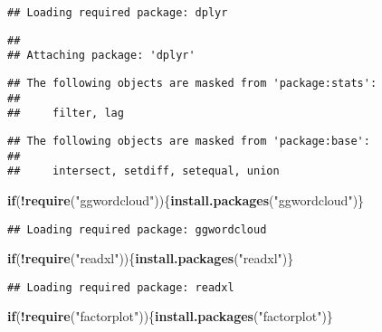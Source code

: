\documentclass[
]{article}
\newenvironment{Shaded}{\begin{snugshade}}{\end{snugshade}}
\newcommand{\ControlFlowTok}[1]{\textcolor[rgb]{0.13,0.29,0.53}{\textbf{#1}}}
\newcommand{\KeywordTok}[1]{\textcolor[rgb]{0.13,0.29,0.53}{\textbf{#1}}}
\newcommand{\NormalTok}[1]{#1}
\newcommand{\OperatorTok}[1]{\textcolor[rgb]{0.81,0.36,0.00}{\textbf{#1}}}
\newcommand{\StringTok}[1]{\textcolor[rgb]{0.31,0.60,0.02}{#1}}
\begin{document}
\begin{verbatim}
## Loading required package: dplyr
\end{verbatim}

\begin{verbatim}
## 
## Attaching package: 'dplyr'
\end{verbatim}

\begin{verbatim}
## The following objects are masked from 'package:stats':
## 
##     filter, lag
\end{verbatim}

\begin{verbatim}
## The following objects are masked from 'package:base':
## 
##     intersect, setdiff, setequal, union
\end{verbatim}

\begin{Shaded}
\begin{Highlighting}[]
\ControlFlowTok{if}\NormalTok{(}\OperatorTok{!}\KeywordTok{require}\NormalTok{(}\StringTok{"ggwordcloud"}\NormalTok{))\{}\KeywordTok{install.packages}\NormalTok{(}\StringTok{"ggwordcloud"}\NormalTok{)\}}
\end{Highlighting}
\end{Shaded}

\begin{verbatim}
## Loading required package: ggwordcloud
\end{verbatim}

\begin{Shaded}
\begin{Highlighting}[]
\ControlFlowTok{if}\NormalTok{(}\OperatorTok{!}\KeywordTok{require}\NormalTok{(}\StringTok{"readxl"}\NormalTok{))\{}\KeywordTok{install.packages}\NormalTok{(}\StringTok{"readxl"}\NormalTok{)\}}
\end{Highlighting}
\end{Shaded}

\begin{verbatim}
## Loading required package: readxl
\end{verbatim}

\begin{Shaded}
\begin{Highlighting}[]
\ControlFlowTok{if}\NormalTok{(}\OperatorTok{!}\KeywordTok{require}\NormalTok{(}\StringTok{"factorplot"}\NormalTok{))\{}\KeywordTok{install.packages}\NormalTok{(}\StringTok{"factorplot"}\NormalTok{)\}}
\end{Highlighting}
\end{Shaded}
\end{document}
